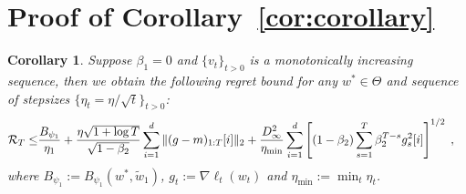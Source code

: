 \documentclass[11pt]{article}
\newtheorem*{Corollary*}{Corollary}
\theoremstyle{k}
\begin{document}
\section{Proof of Corollary~\ref{cor:corollary}}
\begin{Corollary*}
Suppose $\beta_1=0$ and $\{v_t\}_{t>0}$ is a monotonically increasing sequence, then we obtain the following regret bound for any $w^{*} \in \Theta$ and sequence of stepsizes $\{ \eta_t = \eta/\sqrt{t}\}_{t>0}$: 
\begin{equation}\notag
\begin{aligned}
\mathcal{R}_T \leq & \frac{ B_{\psi_1}}{\eta_1}
+ \frac{\eta \sqrt{1 + \log T}}{\sqrt{1 - \beta_2}} \sum_{i=1}^d \| (g-m)_{1:T}[i] \|_2 +\frac{D_{\infty}^2}{\eta_{\min}} \sum_{i=1}^d \left[ (1-\beta_2) \sum_{s=1}^{T} \beta_2^{T-s} g^2_s[i] \right]^{1/2} \;,
\end{aligned}
\end{equation}
where $B_{\psi_1} := B_{\psi_1}(w^*, \tilde{w}_{1})$, $g_{t}:= \nabla \ell_{t}(w_t)$ and $\eta_{{\min}} := \min_{{t}} \eta_{t}$.
\end{Corollary*}
\end{document}
